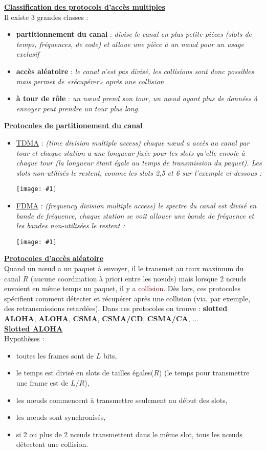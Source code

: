 \documentclass{article}
\newcommand{\ora}[1]{\textcolor{darko}{#1}}
\newcommand{\red}[1]{\textcolor{darkred}{#1}}
\newcommand{\imgR}[2]{\begin{center}\texttt{[image: \#1]}\end{center}}
\newcommand{\point}[2]{\item \ora{\underline{#1}} : \textit{#2}}
\newcommand{\bfp}[2]{\item \textbf{#1} : \textit{#2}}
\newcommand{\stitre}[1]{\noindent\textbf{\underline{#1}} \\}
\newcommand{\neuSP}{n\oe ud }
\newcommand{\neus}{n\oe uds}
\newcommand{\neuSPs}{n\oe uds }
\begin{document}
\stitre{Classification des protocols d'accès multiples}

\noindent Il existe 3 grandes classes :
\begin{itemize}
\bfp{partitionnement du canal}{divise le canal en plus petite pièces (slots de temps, fréquences, de code) et 
alloue une pièce à un \neuSP pour un usage exclusif}
\bfp{accès aléatoire}{le canal n'est pas divisé, les collisions sont donc possibles mais permet de «récupérer» 
après une collision}
\bfp{à tour de rôle}{un \neuSP prend son tour, un \neuSP ayant plus de données à envoyer peut prendre un tour 
plus long.} \\
\end{itemize}
\newpage
\stitre{Protocoles de partitionement du canal}

\begin{itemize}
\point{TDMA}{ (time division multiple access) chaque \neuSP a accès au canal par tour et chaque station a une
longueur fixée pour les slots qu'elle envoie à chaque tour (la longueur étant égale au temps de transmission du 
paquet). Les slots non-utilisés le restent, comme les slots 2,5 et 6 sur l'exemple ci-dessous : }
\imgR{CN_109.png}{200}
\point{FDMA}{ (frequency division multiple access) le spectre du canal est divisé en bande de fréquence, chaque 
station se voit allouer une bande de fréquence et les bandes non-utilisées le restent : }
\imgR{CN_110.png}{250}
\end{itemize}

\stitre{Protocoles d'accès aléatoire}

Quand un \neuSP a un paquet à envoyer, il le transmet au taux maximum du canal $R$ (aucune coordination à priori 
entre les \neus ) mais lorsque 2 \neuSPs envoient en même temps un paquet, il y a \red{collision}. Dès lors, ces 
protocoles spécifient comment détecter et récupérer après une collision (via, par exemple, des retransmissions 
retardées). Dans ces protocoles on trouve : \textbf{slotted ALOHA}, \textbf{ALOHA}, \textbf{CSMA}, 
\textbf{CSMA/CD}, \textbf{CSMA/CA}, ... \\

\stitre{Slotted ALOHA}

\underline{Hypothèses} : 
\begin{itemize}
\item toutes les frames sont de $L$ bits,
\item le temps est divisé en slots de tailles égales($R$) (le temps pour transmettre une frame est de $L/R$),
\item les \neuSPs commencent à transmettre seulement au début des slots,
\item les \neuSPs sont synchronisés,
\item si 2 ou plus de 2 \neuSPs transmettent dans le même slot, tous les \neuSPs détectent une collision.
\end{itemize}
\end{document}
